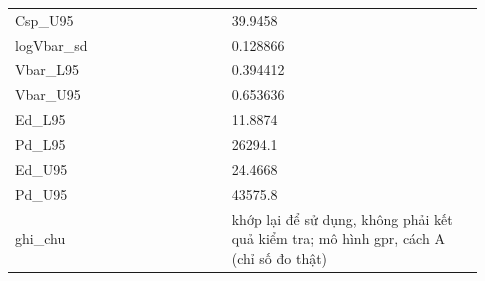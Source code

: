 \begin{longtable}{p{0.43\linewidth}p{0.50\linewidth}}
Csp\_\allowbreak U95 & 39.9458 \\
logVbar\_\allowbreak sd & 0.128866 \\
Vbar\_\allowbreak L95 & 0.394412 \\
Vbar\_\allowbreak U95 & 0.653636 \\
Ed\_\allowbreak L95 & 11.8874 \\
Pd\_\allowbreak L95 & 26294.1 \\
Ed\_\allowbreak U95 & 24.4668 \\
Pd\_\allowbreak U95 & 43575.8 \\
ghi\_\allowbreak chu & khớp lại để sử dụng, không phải kết quả kiểm tra; mô hình gpr, cách A (chỉ số đo thật) \\
\midrule
\bottomrule
\end{longtable}
